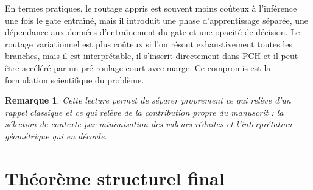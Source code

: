 \documentclass[11pt,a4paper]{article}
\newtheorem{remark}{Remarque}[section]
\begin{document}
En termes pratiques, le routage appris est souvent moins coûteux à l'inférence une fois le gate entraîné, mais il introduit une phase d'apprentissage séparée, une dépendance aux données d'entraînement du gate et une opacité de décision. Le routage variationnel est plus coûteux si l'on résout exhaustivement toutes les branches, mais il est interprétable, il s'inscrit directement dans PCH et il peut être accéléré par un pré-roulage court avec marge. Ce compromis est la formulation scientifique du problème.

\begin{remark}
Cette lecture permet de séparer proprement ce qui relève d'un rappel classique et ce qui relève de la contribution propre du manuscrit : la sélection de contexte par minimisation des valeurs réduites et l'interprétation géométrique qui en découle.
\end{remark}

\section{Théorème structurel final}
\end{document}
